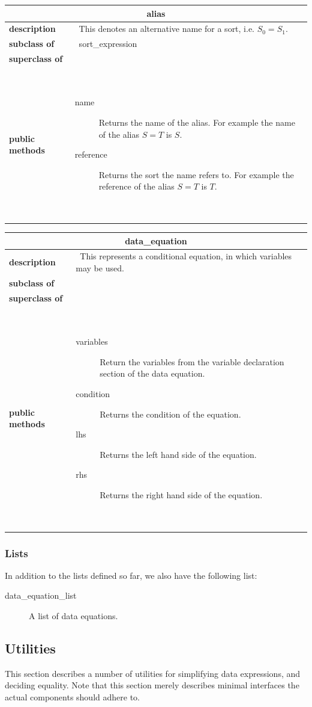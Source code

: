 \documentclass[a4paper,11pt]{article}
\newcommand{\dataclass}[5]{
\begin{flushleft}
\begin{longtable}{p{3cm} p{11cm}}
\multicolumn{2}{c}{\textbf{#1}}\\\hline\hline
\textbf{description} & ~#2~ \\\hline
\textbf{subclass of} & ~#3~ \\\hline
\textbf{superclass of} & ~#4~ \\\hline
\textbf{public methods} & ~#5~ \\\hline
\end{longtable}
\end{flushleft}
}
\begin{document}
\dataclass
  {alias}
  {This denotes an alternative name for a sort, i.e. $S_0 = S_1$.}
  {sort\_expression}
  {}
  {\begin{description}
    \item[name] Returns the name of the alias. For example the name of the alias $S = T$ is $S$.
    \item[reference] Returns the sort the name refers to. For example the reference of the alias $S = T$ is $T$.
   \end{description}}

\dataclass
  {data\_equation}
  {This represents a conditional equation, in which variables may be used.}
  {}
  {}
  {\begin{description}
    \item[variables] Return the variables from the variable declaration section of the data equation.
    \item[condition] Returns the condition of the equation.
    \item[lhs] Returns the left hand side of the equation.
    \item[rhs] Returns the right hand side of the equation.
   \end{description}}

\subsubsection{Lists}
In addition to the lists defined so far, we also have the following list:
\begin{description}
 \item[data\_equation\_list] A list of data equations.
\end{description}

\FloatBarrier
\subsection{Utilities}
This section describes a number of utilities for simplifying data expressions, and deciding equality. Note that this section merely describes minimal interfaces the actual components should adhere to.
\end{document}
